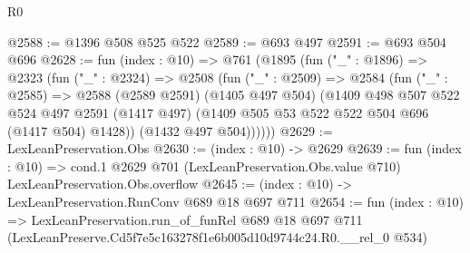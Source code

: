 \begin{lexlean}{R0}
\begin{coremodule}
@2588 := @1396 @508 @525 @522
@2589 := @693 @497
@2591 := @693 @504 @696
@2628 := fun (index : @10) =>
  @761
    (@1895
      (fun ("_" : @1896) =>
      @2323
        (fun ("_" : @2324) =>
        @2508
          (fun ("_" : @2509) =>
          @2584
            (fun ("_" : @2585) =>
            @2588
              (@2589 @2591)
              (@1405 @497 @504)
              (@1409
                @498
                @507
                @522
                @524
                @497
                @2591
                (@1417 @497)
                (@1409 @505 @53 @522 @522 @504 @696 (@1417 @504) @1428))
              (@1432 @497 @504))))))
@2629 := LexLeanPreservation.Obs
@2630 := (index : @10) -> @2629
@2639 := fun (index : @10) =>
  cond.{1} @2629 @701 (LexLeanPreservation.Obs.value @710) LexLeanPreservation.Obs.overflow
@2645 := (index : @10) -> LexLeanPreservation.RunConv @689 @18 @697 @711
@2654 := fun (index : @10) =>
  LexLeanPreservation.run_of_funRel
    @689
    @18
    @697
    @711
    (LexLeanPreserve.Cd5f7e5c163278f1e6b005d10d9744c24.R0.__rel_0 @534)
\end{coremodule}
\end{lexlean}
